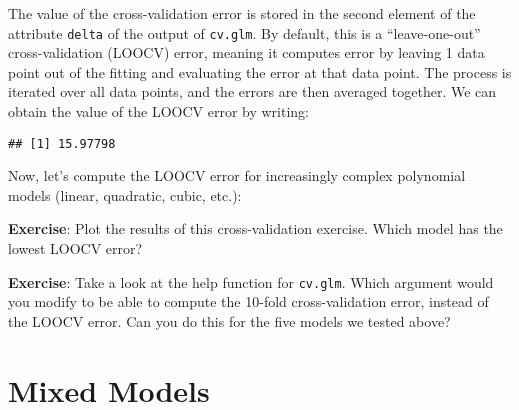 \documentclass[
]{book}
\newenvironment{Shaded}{\begin{snugshade}}{\end{snugshade}}
\newcommand{\ControlFlowTok}[1]{\textcolor[rgb]{0.13,0.29,0.53}{\textbf{#1}}}
\newcommand{\DataTypeTok}[1]{\textcolor[rgb]{0.13,0.29,0.53}{#1}}
\newcommand{\DecValTok}[1]{\textcolor[rgb]{0.00,0.00,0.81}{#1}}
\newcommand{\KeywordTok}[1]{\textcolor[rgb]{0.13,0.29,0.53}{\textbf{#1}}}
\newcommand{\NormalTok}[1]{#1}
\newcommand{\OperatorTok}[1]{\textcolor[rgb]{0.81,0.36,0.00}{\textbf{#1}}}
\newcommand{\StringTok}[1]{\textcolor[rgb]{0.31,0.60,0.02}{#1}}
\begin{document}
The value of the cross-validation error is stored in the second element of the attribute \texttt{delta} of the output of \texttt{cv.glm}. By default, this is a ``leave-one-out'' cross-validation (LOOCV) error, meaning it computes error by leaving 1 data point out of the fitting and evaluating the error at that data point. The process is iterated over all data points, and the errors are then averaged together. We can obtain the value of the LOOCV error by writing:

\begin{Shaded}
\end{Shaded}

\begin{verbatim}
## [1] 15.97798
\end{verbatim}

Now, let's compute the LOOCV error for increasingly complex polynomial models (linear, quadratic, cubic, etc.):

\begin{Shaded}
\end{Shaded}

\textbf{Exercise}: Plot the results of this cross-validation exercise. Which model has the lowest LOOCV error?

\textbf{Exercise}: Take a look at the help function for \texttt{cv.glm}. Which argument would you modify to be able to compute the 10-fold cross-validation error, instead of the LOOCV error. Can you do this for the five models we tested above?

\hypertarget{mixed-models}{%
\chapter{Mixed Models}\label{mixed-models}}
\end{document}
